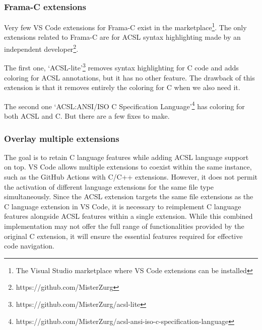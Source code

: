 \documentclass[10pt]{article}
\begin{document}
\begin{singlespace}
\subsubsection{Frama-C extensions} 
\label{sec:framac-vscode-ext}
Very few VS Code extensions for Frama-C exist in the marketplace\footnote{The Visual Studio marketplace where VS Code extensions can be installed}.
The only extensions related to Frama-C are for ACSL syntax highlighting made by an independent developer\footnote{https://github.com/MisterZurg}. 

The first one, `ACSL-lite'\footnote{https://github.com/MisterZurg/acsl-lite} removes syntax highlighting for C code and adds coloring for ACSL annotations, but it has no other feature. The drawback of this extension is that it removes entirely the coloring for C when we also need it. 

The second one `ACSL:\@ ANSI/ISO C Specification Language'\footnote{https://github.com/MisterZurg/acsl-ansi-iso-c-specification-language} has coloring for both ACSL and C. But there are a few fixes to make.



\subsubsection{Overlay multiple extensions}
The goal is to retain C language features while adding ACSL language support on top. VS Code allows multiple extensions to coexist within the same instance, such as the GitHub Actions with C/C++ extensions. However, it does not permit the activation of different language extensions for the same file type simultaneously. Since the ACSL extension targets the same file extensions as the C language extension in VS Code, it is necessary to reimplement C language features alongside ACSL features within a single extension. While this combined implementation may not offer the full range of functionalities provided by the original C extension, it will ensure the essential features required for effective code navigation.


\end{singlespace}
\end{document}
